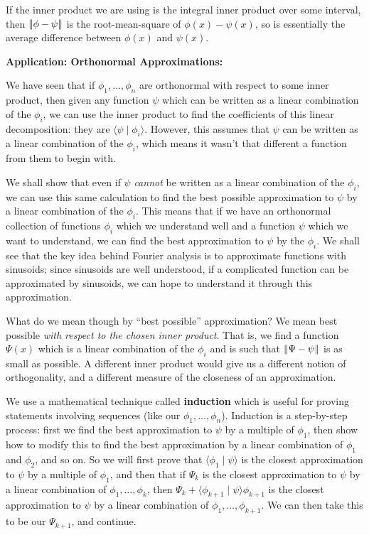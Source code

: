 \documentclass{article}
\newcommand{\norm}[1]{\left|\kern-1pt\left|#1\right|\kern-1pt\right|}
\begin{document}
If the inner product we are using is the integral inner product over some interval, then $\norm{\phi-\psi}$ is the root-mean-square of $\phi(x)-\psi(x)$, so is essentially the average difference between $\phi(x)$ and $\psi(x)$.





\clearpage



\textbf{Application: Orthonormal Approximations:}\bigskip


 We have seen that if $\phi_1,\hdots,\phi_n$ are orthonormal with respect to some inner product, then given any function $\psi$ which can be written as a linear combination of the $\phi_i$, we can use the inner product to find the coefficients of this linear decomposition: they are $\langle\psi\mid\phi_i\rangle$. However, this assumes that $\psi$ can be written as a linear combination of the $\phi_i$, which means it wasn't that different a function from them to begin with.
 
 We shall show that even if $\psi$ \textit{cannot} be written as a linear combination of the $\phi_i$, we can use this same calculation to find the best possible approximation to $\psi$ by a linear combination of the $\phi_i$. This means that if we have an orthonormal collection of functions $\phi_i$ which we understand well and a function $\psi$ which we want to understand, we can find the best approximation to $\psi$ by the $\phi_i$. We shall see that the key idea behind Fourier analysis is to approximate functions with sinusoids; since sinusoids are well understood, if a complicated function can be approximated by sinusoids, we can hope to understand it through this approximation.
 
 What do we mean though by ``best possible'' approximation? We mean best possible \textit{with respect to the chosen inner product}. That is, we find a function $\Psi(x)$ which is a linear combination of the $\phi_i$ and is such that $\norm{\Psi-\psi}$ is as small as possible. A different inner product would give us a different notion of orthogonality, and a different measure of the closeness of an approximation.\medskip
 
 We use a mathematical technique called \textbf{induction} which is useful for proving statements involving sequences (like our $\phi_1,\hdots,\phi_n$). Induction is a step-by-step process: first we find the best approximation to $\psi$ by a multiple of $\phi_1$, then show how to modify this to find the best approximation by a linear combination of $\phi_1$ and $\phi_2$, and so on. So we will first prove that $\langle\phi_1\mid\psi\rangle$ is the closest approximation to $\psi$ by a multiple of $\phi_1$, and then that if $\Psi_k$ is the closest approximation to $\psi$ by a linear combination of $\phi_1,\hdots,\phi_k$, then $\Psi_k+\langle\phi_{k+1}\mid\psi\rangle\phi_{k+1}$ is the closest approximation to $\psi$ by a linear combination of $\phi_1,\hdots,\phi_{k+1}$. We can then take this to be our $\Psi_{k+1}$, and continue.
 
\end{document}

